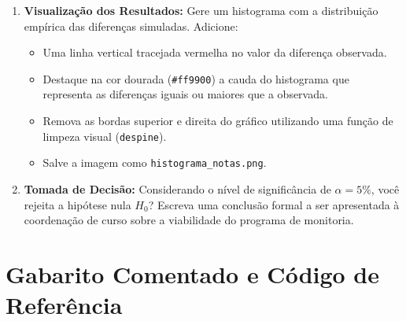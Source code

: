 \documentclass[12pt]{article}
\begin{document}
\begin{enumerate}[label=\textbf{Tarefa \arabic*}]
    \item \textbf{Visualização dos Resultados:}
    Gere um histograma com a distribuição empírica das diferenças simuladas. Adicione:
    \begin{itemize}
        \item Uma linha vertical tracejada vermelha no valor da diferença observada.
        \item Destaque na cor dourada (\texttt{\#ff9900}) a cauda do histograma que representa as diferenças iguais ou maiores que a observada.
        \item Remova as bordas superior e direita do gráfico utilizando uma função de limpeza visual (\texttt{despine}).
        \item Salve a imagem como \texttt{histograma\_notas.png}.
    \end{itemize}
    
    \item \textbf{Tomada de Decisão:}
    Considerando o nível de significância de $\alpha = 5\%$, você rejeita a hipótese nula $H_0$? Escreva uma conclusão formal a ser apresentada à coordenação de curso sobre a viabilidade do programa de monitoria.
\end{enumerate}

\pagebreak

\section*{Gabarito Comentado e Código de Referência}
\end{document}

